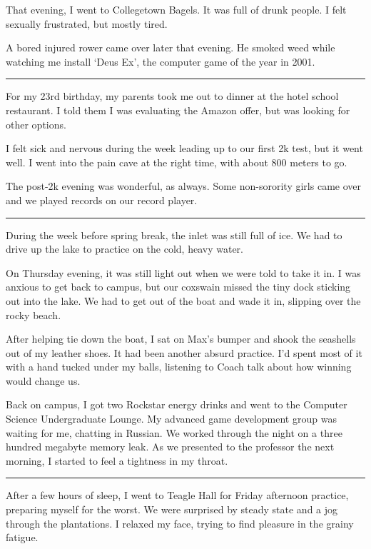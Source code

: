 That evening, I went to Collegetown Bagels.  It was full of drunk people.  I
felt sexually frustrated, but mostly tired.  

A bored injured rower came over later that evening.  He smoked weed while
watching me install `Deus Ex', the computer game of the year in 2001. 

\plainfancybreak{12pt}{2}{}

For my 23rd birthday, my parents took me out to dinner at the hotel school
restaurant.  I told them I was evaluating the Amazon offer, but was looking for
other options.

I felt sick and nervous during the week leading up to our first 2k test, but it
went well.  I went into the pain cave at the right time, with about 800 meters
to go.  

The post-2k evening was wonderful, as always.  Some non-sorority girls came over
and we played records on our record player.  

\plainfancybreak{12pt}{2}{}

During the week before spring break, the inlet was still full of ice.  We had to
drive up the lake to practice on the cold, heavy water. 

On Thursday evening, it was still light out when we were told to take it in.  I
was anxious to get back to campus, but our coxswain missed the tiny dock
sticking out into the lake.  We had to get out of the boat and wade it in,
slipping over the rocky beach.

After helping tie down the boat, I sat on Max's bumper and shook the seashells
out of my leather shoes.  It had been another absurd practice.  I'd spent most
of it with a hand tucked under my balls, listening to Coach talk about how
winning would change us.  

Back on campus, I got two Rockstar energy drinks and went to the Computer
Science Undergraduate Lounge.  My advanced game development group was waiting
for me, chatting in Russian.  We worked through the night on a three hundred
megabyte memory leak.  As we presented to the professor the next morning, I
started to feel a tightness in my throat.

\plainfancybreak{12pt}{2}{}

After a few hours of sleep, I went to Teagle Hall for Friday afternoon practice,
preparing myself for the worst.  We were surprised by steady state and a jog
through the plantations.  I relaxed my face, trying to find pleasure in the
grainy fatigue.

